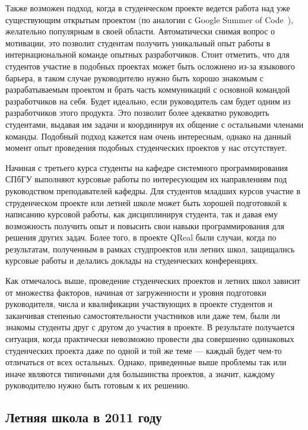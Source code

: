 \documentclass[a4paper]{article}
\begin{document}
Также возможен подход, когда в студенческом проекте ведется работа над уже существующим открытым проектом (по аналогии с Google Summer of Code~\cite{google}), желательно популярным в своей области. Автоматически снимая вопрос о мотивации, это позволит студентам получить уникальный опыт работы в интернациональной команде опытных разработчиков. Стоит отметить, что для студентов участие в подобных проектах может быть осложнено из-за языкового барьера, в таком случае руководителю нужно быть хорошо знакомым с разрабатываемым проектом и брать часть коммуникаций с основной командой разработчиков на себя. Будет идеально, если руководитель сам будет одним из разработчиков этого продукта. Это позволит более адекватно руководить студентами, выдавая им задачи и координируя их общение с остальными членами команды. Подобный подход кажется нам очень интересным, однако на данный момент опыт проведения подобных студенческих проектов у нас отсутствует.

Начиная с третьего курса студенты на кафедре системного программирования СПбГУ выполняют курсовые работы по интересующим их направлениям под руководством преподавателей кафедры. Для студентов младших курсов участие в струденческом проекте или летней школе может быть хорошей подготовкой к написанию курсовой работы, как дисциплинируя студента, так и давая ему возможность получить опыт и повысить свои навыки программирования для решения других задач. Более того, в проекте QReal были случаи, когда по результатам, полученным в рамках студпроектов или летних школ, защищались курсовые работы и делались доклады на студенческих конференциях.

Как отмечалось выше, проведение студенческих проектов и летних школ зависит от множества факторов, начиная от загруженности и уровня подготовки руководителя, числа и квалификации участвующих в проекте студентов и заканчивая степенью самостоятельности участников или даже тем, были ли знакомы студенты друг с другом до участия в проекте. В результате получается ситуация, когда практически невозможно провести два совершенно одинаковых студенческих проекта даже по одной и той же теме --- каждый будет чем-то отличаться от всех остальных. Однако, приведенные выше проблемы так или иначе являются типичными для большинства проектов, а значит, каждому руководителю нужно быть готовым к их решению.

\subsection{Летняя школа в 2011 году}
\end{document}
